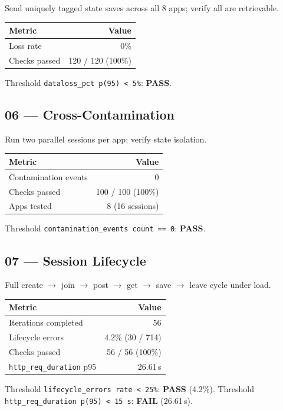 \documentclass[11pt,a4paper]{article}
\newcommand{\pass}{\textcolor{pass}{\textbf{PASS}}}
\newcommand{\fail}{\textcolor{fail}{\textbf{FAIL}}}
\begin{document}
Send uniquely tagged state saves across all 8 apps; verify all are retrievable.

\begin{tabular}{@{}lr@{}}
\toprule
\textbf{Metric} & \textbf{Value} \\
\midrule
Loss rate       & 0\% \\
Checks passed   & 120 / 120 (100\%) \\
\bottomrule
\end{tabular}

\medskip
\noindent Threshold \texttt{dataloss\_pct p(95) < 5\%}: \pass.

\subsection{06 — Cross-Contamination}

Run two parallel sessions per app; verify state isolation.

\begin{tabular}{@{}lr@{}}
\toprule
\textbf{Metric} & \textbf{Value} \\
\midrule
Contamination events & 0 \\
Checks passed        & 100 / 100 (100\%) \\
Apps tested          & 8 (16 sessions) \\
\bottomrule
\end{tabular}

\medskip
\noindent Threshold \texttt{contamination\_events count == 0}: \pass.

\subsection{07 — Session Lifecycle}

Full create $\to$ join $\to$ post $\to$ get $\to$ save $\to$ leave cycle under load.

\begin{tabular}{@{}lr@{}}
\toprule
\textbf{Metric} & \textbf{Value} \\
\midrule
Iterations completed & 56 \\
Lifecycle errors     & 4.2\% (30 / 714) \\
Checks passed        & 56 / 56 (100\%) \\
\texttt{http\_req\_duration} p95 & 26.61\,s \\
\bottomrule
\end{tabular}

\medskip
\noindent Threshold \texttt{lifecycle\_errors rate < 25\%}: \pass{} (4.2\%).
Threshold \texttt{http\_req\_duration p(95) < 15\,s}: \fail{} (26.61\,s).
\end{document}

